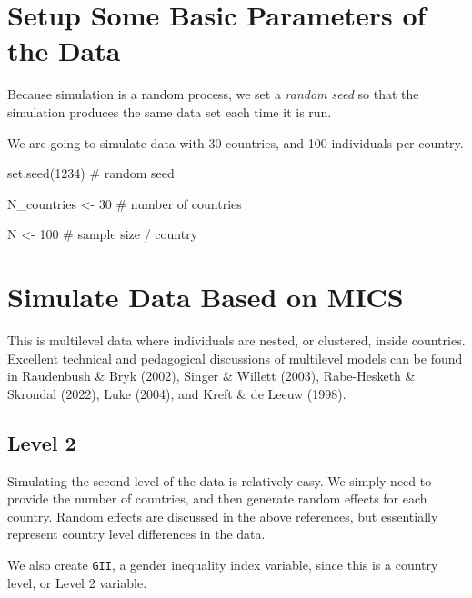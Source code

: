 \documentclass[
  letterpaper,
  DIV=11,
  numbers=noendperiod]{scrreprt}
\newenvironment{Shaded}{\begin{snugshade}}{\end{snugshade}}
\newcommand{\CommentTok}[1]{\textcolor[rgb]{0.37,0.37,0.37}{#1}}
\newcommand{\DecValTok}[1]{\textcolor[rgb]{0.68,0.00,0.00}{#1}}
\newcommand{\FunctionTok}[1]{\textcolor[rgb]{0.28,0.35,0.67}{#1}}
\newcommand{\NormalTok}[1]{\textcolor[rgb]{0.00,0.23,0.31}{#1}}
\newcommand{\OtherTok}[1]{\textcolor[rgb]{0.00,0.23,0.31}{#1}}
\begin{document}
\hypertarget{setup-some-basic-parameters-of-the-data}{%
\section{Setup Some Basic Parameters of the
Data}\label{setup-some-basic-parameters-of-the-data}}

Because simulation is a random process, we set a \emph{random seed} so
that the simulation produces the same data set each time it is run.

We are going to simulate data with 30 countries, and 100 individuals per
country.

\begin{Shaded}
\begin{Highlighting}[]
\FunctionTok{set.seed}\NormalTok{(}\DecValTok{1234}\NormalTok{) }\CommentTok{\# random seed}

\NormalTok{N\_countries }\OtherTok{\textless{}{-}} \DecValTok{30} \CommentTok{\# number of countries}

\NormalTok{N }\OtherTok{\textless{}{-}} \DecValTok{100} \CommentTok{\# sample size / country}
\end{Highlighting}
\end{Shaded}

\hypertarget{simulate-data-based-on-mics}{%
\section{Simulate Data Based on
MICS}\label{simulate-data-based-on-mics}}

This is multilevel data where individuals are nested, or clustered,
inside countries. Excellent technical and pedagogical discussions of
multilevel models can be found in Raudenbush \& Bryk (2002), Singer \&
Willett (2003), Rabe-Hesketh \& Skrondal (2022), Luke (2004), and Kreft
\& de Leeuw (1998).

\hypertarget{level-2}{%
\subsection{Level 2}\label{level-2}}

Simulating the second level of the data is relatively easy. We simply
need to provide the number of countries, and then generate random
effects for each country. Random effects are discussed in the above
references, but essentially represent country level differences in the
data.

We also create \texttt{GII}, a gender inequality index variable, since
this is a country level, or Level 2 variable.
\end{document}
